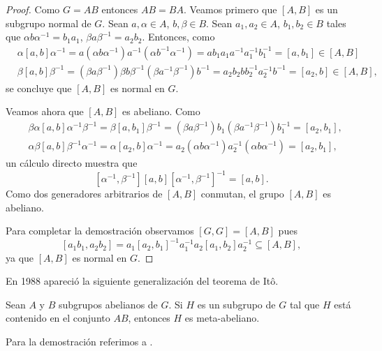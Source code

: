 \begin{proof}
	Como $G=AB$ entonces $AB=BA$. Veamos primero que $[A,B]$ es un subgrupo
	normal de $G$. Sean $a,\alpha\in A$, $b,\beta\in B$. Sean $a_1,a_2\in A$,
	$b_1,b_2\in B$ tales que $\alpha b\alpha^{-1}=b_1a_1$, $\beta
	a\beta^{-1}=a_2b_2$. Entonces, como
	\begin{align*}
		&\alpha[a,b]\alpha^{-1}=a(\alpha b\alpha^{-1})a^{-1}(\alpha b^{-1}\alpha^{-1})=ab_1a_1a^{-1}a_1^{-1}b_1^{-1}=[a,b_1]\in [A,B]\\
		&\beta[a,b]\beta^{-1}=(\beta a\beta^{-1})\beta b\beta^{-1}(\beta a^{-1}\beta^{-1})b^{-1}=a_2b_2bb_2^{-1}a_2^{-1}b^{-1}=[a_2,b]\in [A,B],
	\end{align*}
	se concluye que $[A,B]$ es normal en $G$. 

	Veamos ahora que $[A,B]$ es abeliano. Como 
	\begin{align*}
		&\beta\alpha[a,b]\alpha^{-1}\beta^{-1} = \beta[a,b_1]\beta^{-1}=(\beta a\beta^{-1})b_1(\beta a^{-1}\beta^{-1})b_1^{-1}=[a_2,b_1],\\
		&\alpha\beta[a,b]\beta^{-1}\alpha^{-1} = \alpha[a_2,b]\alpha^{-1}=a_2(\alpha b\alpha^{-1})a_2^{-1}(\alpha b\alpha^{-1})=[a_2,b_1],
	\end{align*}
	un cálculo directo muestra que 
	\[
		[\alpha^{-1},\beta^{-1}][a,b][\alpha^{-1},\beta^{-1}]^{-1}=[a,b].
	\]
	Como dos generadores arbitrarios de $[A,B]$ conmutan, el grupo $[A,B]$ es
	abeliano. 
	
	Para completar la demostración observamos $[G,G]=[A,B]$ pues 
	\[
	[a_1b_1,a_2b_2]=a_1[a_2,b_1]^{-1}a_1^{-1}a_2[a_1,b_2]a_2^{-1}\subseteq [A,B],
	\]
	ya que $[A,B]$ es normal en $G$. 
\end{proof}

En 1988 apareció la siguiente generalización 
del teorema de It\^o. 

\begin{theorem}[Sysak]
    Sean $A$ y $B$ subgrupos abelianos de $G$. Si $H$ es un
    subgrupo de $G$ tal que $H$ está contenido en el 
    conjunto $AB$, entonces $H$ es meta-abeliano. 
\end{theorem}

Para la demostración referimos a \cite{MR988177}.